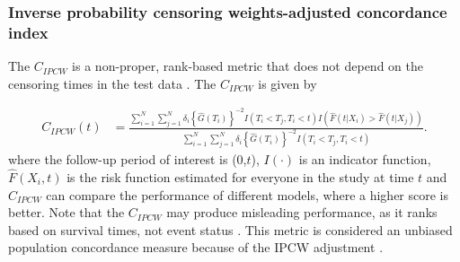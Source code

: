 \documentclass[AMA,STIX1COL,]{WileyNJD-v2}
\begin{document}
\hypertarget{inverse-probability-censoring-weights-adjusted-concordance-index}{%
\subsubsection{Inverse probability censoring weights-adjusted
concordance
index}\label{inverse-probability-censoring-weights-adjusted-concordance-index}}

The \(C_{IPCW}\) is a non-proper, rank-based metric that does not depend
on the censoring times in the test data \citep{uno2011}. The
\(C_{IPCW}\) is given by

\begin{align} \label{eq:cidx}
C_{IPCW}(t) &= \frac{\sum^{N}_{i=1}\sum^{N}_{j=1}\delta_{i}\left\{\widehat{G}(T_{i})\right\}^{-2} I(T_{i}<T_{j},T_{i}<t) I\left(\widehat{F}(t|X_{i})>\widehat{F}(t|X_{j})\right)}{\sum^{N}_{i=1}\sum^{N}_{j=1}\delta_{i}\left\{\widehat{G}(T_{i})\right\}^{-2} I(T_{i}<T_{j},T_{i}<t)}.
\end{align} where the follow-up period of interest is (0,\(t\)),
\(I(\cdot)\) is an indicator function, \(\widehat{F}(X_{i},t)\) is the
risk function estimated for everyone in the study at time \(t\) and
\(C_{IPCW}\) can compare the performance of different models, where a
higher score is better. Note that the \(C_{IPCW}\) may produce
misleading performance, as it ranks based on survival times, not event
status \citep{cindexfails2019}. This metric is considered an unbiased
population concordance measure because of the IPCW adjustment
\citep{uno2011}.
\end{document}
